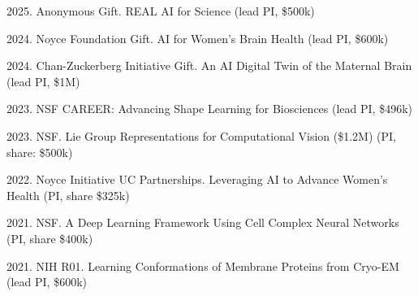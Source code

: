 2025. Anonymous Gift. REAL AI for Science \hfill (lead PI, \$500k) 

2024. Noyce Foundation Gift. AI for Women's Brain Health \hfill (lead PI, \$600k) 

2024. Chan-Zuckerberg Initiative Gift. An AI Digital Twin of the Maternal Brain \hfill (lead PI, \$1M) 

2023. NSF CAREER: Advancing Shape Learning for Biosciences \hfill (lead PI, \$496k) 

2023. NSF. Lie Group Representations for Computational Vision (\$1.2M) \hfill (PI, share: \$500k) 

2022. Noyce Initiative UC Partnerships. Leveraging AI to Advance Women’s Health \hfill (PI, share \$325k)

2021. NSF. A Deep Learning Framework Using Cell Complex Neural Networks \hfill (PI, share \$400k)

2021. NIH R01. Learning Conformations of Membrane Proteins from Cryo-EM \hfill (lead PI, \$600k)

